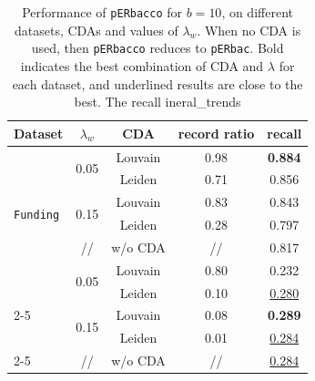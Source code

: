 \documentclass[sigconf, nonacm]{acmart}
\newcommand{\window}{b}
\newcommand{\perbacco}{\texttt{pERbacco}\xspace}
\newcommand{\perbac}{\texttt{pERbac}\xspace}
\newcommand{\funding}{\texttt{Funding}\xspace}
\newcommand{\voters}{\texttt{Voters}\xspace}
\begin{document}
{\small
\begin{table}[h]
\centering
\begin{tabular}{l c c c c}
\toprule
\textbf{Dataset} & $\lambda_w$ & \textbf{CDA} & \textbf{record ratio} & \textbf{recall} \\

\midrule
\multirow{6}{*}{\funding} 
  & \multirow{2}{*}{0.05}  & Louvain  & 0.98 & \textbf{0.884}\\
  &                        & Leiden  & 0.71  & 0.856   \\
\cmidrule(lr){2-5}
  & \multirow{2}{*}{0.15}  & Louvain  & 0.83 & 0.843 \\
  &                        & Leiden  & 0.28  & 0.797 \\

  \cmidrule(lr){2-5}
 &   \multirow{1}{*}{//}   & w/o CDA  & //   & 0.817 \\
\midrule

\multirow{6}{*}{\voters} 
  & \multirow{2}{*}{0.05}  & Louvain & 0.80  & 0.232  \\
  &                        & Leiden  & 0.10  & \underline{0.280} \\
\cmidrule(lr){2-5}
  & \multirow{2}{*}{0.15}  & Louvain & 0.08  & \textbf{0.289}  \\
  &                        & Leiden  & 0.01  & \underline{0.284}\\
  \cmidrule(lr){2-5}
 &   \multirow{1}{*}{//}   & w/o CDA  & //   & \underline{0.284} \\
\bottomrule
\end{tabular}
\caption{Performance of \perbacco for $\window=10$, on different datasets, CDAs and values of $\lambda_w$. When no CDA is used, then \perbacco reduces to \perbac. Bold indicates the best combination of CDA and $\lambda$ for each dataset, and underlined results are close to the best. The recall ineral_trends}
\end{table}
}
\end{document}
